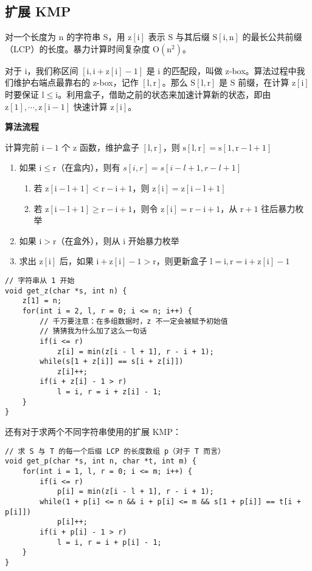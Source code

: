\documentclass[UTF8]{article}
\begin{document}
\subsection{扩展 KMP}
对一个长度为 $\mathrm{n}$ 的字符串 $\mathrm{S}$，用 $\mathrm{z[i]}$ 表示 $\mathrm{S}$ 与其后缀 $\mathrm{S[i, n]}$ 的最长公共前缀（LCP）的长度。暴力计算时间复杂度 $\mathrm{O(n^2)}$。

对于 $\mathrm{i}$，我们称区间 $\mathrm{[i, i + z[i] - 1]}$ 是 $\mathrm{i}$ 的匹配段，叫做 z-box。算法过程中我们维护右端点最靠右的 z-box，记作 $\mathrm{[l, r]}$。那么 $\mathrm{S[l, r]}$ 是 $\mathrm{S}$ 前缀，在计算 $\mathrm{z[i]}$ 时要保证 $\mathrm{l \le i}$。利用盒子，借助之前的状态来加速计算新的状态，即由 $\mathrm{z[1], \cdots, z[i - 1]}$ 快速计算 $\mathrm{z[i]}$。

\noindent \textbf{算法流程}

计算完前 $\mathrm{i - 1}$ 个 $\mathrm{z}$ 函数，维护盒子 $\mathrm{[l, r]}$，则 $\mathrm{s[l, r] = s[1, r - l + 1]}$

\begin{enumerate}
	\item 如果 $\mathrm{i \le r}$（在盒内），则有 $s[i, r] = s[i - l + 1, r - l + 1]$		
	\begin{enumerate}
		\item 若 $\mathrm{z[i - l + 1] < r - i + 1}$，则 $\mathrm{z[i] = z[i - l +1]}$
		\item 若 $\mathrm{z[i - l + 1] \ge r - i + 1}$，则令 $\mathrm{z[i] = r - i + 1}$，从 $\mathrm{r + 1}$ 往后暴力枚举
	\end{enumerate}
	\item 如果 $\mathrm{i > r}$（在盒外），则从 $\mathrm{i}$ 开始暴力枚举
	\item 求出 $\mathrm{z[i]}$ 后，如果 $\mathrm{i + z[i] - 1 > r}$，则更新盒子 $\mathrm{l = i, r = i + z[i] - 1}$
\end{enumerate}

\begin{lstlisting}[caption=扩展 KMP]
// 字符串从 1 开始
void get_z(char *s, int n) {
	z[1] = n;
	for(int i = 2, l, r = 0; i <= n; i++) {
		// 千万要注意：在多组数据时，z 不一定会被赋予初始值
		// 猜猜我为什么加了这么一句话
		if(i <= r)
			z[i] = min(z[i - l + 1], r - i + 1);
		while(s[1 + z[i]] == s[i + z[i]])
			z[i]++;
		if(i + z[i] - 1 > r)
			l = i, r = i + z[i] - 1;
	}
}
\end{lstlisting}

还有对于求两个不同字符串使用的扩展 KMP：
\begin{lstlisting}[caption=扩展 KMP]
// 求 S 与 T 的每一个后缀 LCP 的长度数组 p（对于 T 而言）
void get_p(char *s, int n, char *t, int m) {
	for(int i = 1, l, r = 0; i <= m; i++) {
		if(i <= r)
			p[i] = min(z[i - l + 1], r - i + 1);
		while(1 + p[i] <= n && i + p[i] <= m && s[1 + p[i]] == t[i + p[i]])
			p[i]++;
		if(i + p[i] - 1 > r)
			l = i, r = i + p[i] - 1;
	}
}
\end{lstlisting}
\end{document}
